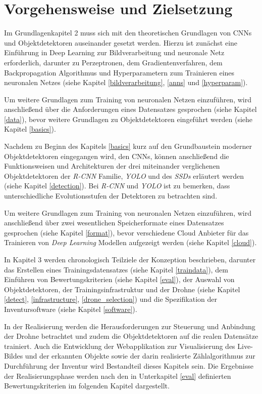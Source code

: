 \section{Vorgehensweise und Zielsetzung}

Im Grundlagenkapitel 2 muss sich mit den theoretischen Grundlagen von CNNs und Objektdetektoren auseinander gesetzt werden. Hierzu ist zunächst eine Einführung in Deep Learning zur Bildverarbeitung und neuronale Netz erforderlich, darunter zu Perzeptronen, dem Gradientenverfahren, dem Backpropagation Algorithmus und Hyperparametern zum Trainieren eines neuronalen Netzes (siehe Kapitel \ref{bildverarbeitung}, \ref{anns} und \ref{hyperparam}). 

Um weitere Grundlagen zum Training von neuronalen Netzen einzuführen, wird anschließend über die Anforderungen eines Datensatzes gesprochen (siehe Kapitel \ref{data}), bevor weitere Grundlagen zu Objektdetektoren eingeführt werden (siehe Kapitel \ref{basics}). 

Nachdem zu Beginn des Kapitels \ref{basics} kurz auf den Grundbaustein moderner Objektdetektoren eingegangen wird, den CNNs, können anschließend die Funktionsweisen und Architekturen der drei miteinander verglichenen Objektdetektoren der \textit{R-CNN} Familie, \textit{YOLO} und des \textit{SSDs} erläutert werden (siehe Kapitel \ref{detection}). Bei \textit{R-CNN} und \textit{YOLO} ist zu bemerken, dass unterschiedliche Evolutionsstufen der Detektoren zu betrachten sind.

Um weitere Grundlagen zum Training von neuronalen Netzen einzuführen, wird anschließend über zwei wesentlichen Speicherformate eines Datensatzes gesprochen (siehe Kapitel \ref{format}), bevor verschiedene Cloud Anbieter für das Trainieren von \textit{Deep Learning} Modellen aufgezeigt werden (siehe Kapitel \ref{cloud}). 

In Kapitel 3 werden chronologisch Teilziele der Konzeption beschrieben, darunter das Erstellen eines Trainingsdatensatzes (siehe Kapitel \ref{traindata}), dem Einführen von Bewertungskriterien (siehe Kapitel \ref{eval}), der Auswahl von Objektdetektoren, der Trainingsinfrastruktur und der Drohne (siehe Kapitel \ref{detect}, \ref{infrastructure}, \ref{drone_selection}) und die Spezifikation der Inventursoftware (siehe Kapitel \ref{software}).

In der Realisierung werden die Herausforderungen zur Steuerung und Anbindung der Drohne betrachtet und zudem die Objektdetektoren auf die realen Datensätze trainiert. Auch die Entwicklung der Webapplikation zur Visualisierung des Live-Bildes und der erkannten Objekte sowie der darin realisierte Zählalgorithmus zur Durchführung der Inventur wird Bestandteil dieses Kapitels sein. Die Ergebnisse der Realisierungsphase werden nach den in Unterkapitel \ref{eval} definierten Bewertungskriterien im folgenden Kapitel dargestellt. 


